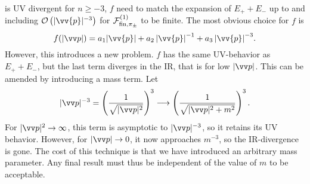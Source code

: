 is UV divergent for $n \geq -3$, $f$ need to match the expansion of $E_+ + E_-$ up to and including $\Oh[-3]{|\vv{p}|}$ for $\mathcal{F}^{(1)}_{\mathrm{fin}, \pi_\pm }$ to be finite.
The most obvious choice for $f$ is
\begin{equation}
    f(|\vv p|) 
    = a_1  \abs{\vv{p}} + a_2 \, {\abs{\vv{p}}}^{-1} + a_3 \, {\abs{\vv{p}}}^{-3}.
\end{equation}
However, this introduces a new problem.
$f$ has the same UV-behavior as $E_+ + E_-$, but the last term diverges in the IR, that is for low $|\vv p|$.
This can be amended by introducing a mass term.
Let
\begin{equation}
    |\vv p|^{-3} 
    = 
    \left(\frac{1}{\sqrt{|\vv p|^2}}\right)^3 
    \longrightarrow 
    \left(\frac{1}{\sqrt{|\vv p|^2 + m^2}}\right)^3.
\end{equation}
For $|\vv p|^2 \rightarrow \infty$, this term is asymptotic to $|\vv p|^{-3}$, so it retains its UV behavior.
However, for $|\vv p| \rightarrow 0$, it now approaches $m^{-3}$, so the IR-divergence is gone.
The cost of this technique is that we have introduced an arbitrary mass parameter.
Any final result must thus be independent of the value of $m$ to be acceptable.

